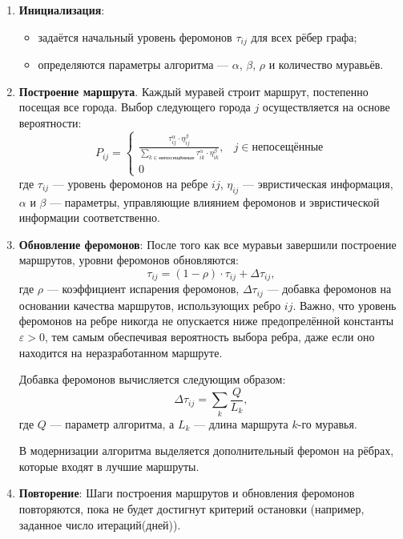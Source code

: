 \begin{enumerate}
	\item \textbf{Инициализация}:
	\begin{itemize}
		\item задаётся начальный уровень феромонов $\tau_{ij}$ для всех рёбер графа;
		\item определяются параметры алгоритма --- \(\alpha\), \(\beta\), \(\rho\) и количество муравьёв.
	\end{itemize}
	
	\item \textbf{Построение маршрута}.	Каждый муравей строит маршрут, постепенно посещая все города. Выбор следующего города $j$ осуществляется на основе вероятности:
	\begin{equation}
		P_{ij} = 
		\begin{cases}\label{for:Lev}
			\frac{\tau_{ij}^\alpha \cdot \eta_{ij}^\beta}{\sum_{k \in \text{непосещённые}} \tau_{ik}^\alpha \cdot \eta_{ik}^\beta}, & j \in \text{непосещённые} \\
			0 &
		\end{cases}
	\end{equation}
	где  $\tau_{ij}$ --- уровень феромонов на ребре $ij$,  $\eta_{ij}$ --- эвристическая информация,  $\alpha$ и $\beta$ --- параметры, управляющие влиянием феромонов и эвристической информации соответственно.
	
	\item \textbf{Обновление феромонов}:
	После того как все муравьи завершили построение маршрутов, уровни феромонов обновляются:
	\begin{equation}
		\tau_{ij} = (1 - \rho) \cdot \tau_{ij} + \Delta \tau_{ij},
	\end{equation}
	где $\rho$ --- коэффициент испарения феромонов, $\Delta \tau_{ij}$ --- добавка феромонов на основании качества маршрутов, использующих ребро $ij$.
	\newline Важно, что уровень феромонов на ребре никогда не опускается ниже предопрелённой константы $\varepsilon > 0$, тем самым обеспечивая вероятность выбора ребра, даже если оно находится на неразработанном маршруте.
	\par
	Добавка феромонов вычисляется следующим образом:
	\begin{equation}
		\Delta \tau_{ij} = \sum_{k} \frac{Q}{L_k},
	\end{equation}
	где $Q$ --- параметр алгоритма, а $L_k$ --- длина маршрута $k$-го муравья.
	
	В модернизации алгоритма выделяется дополнительный феромон на рёбрах, которые входят в лучшие маршруты.\par
		
	\item \textbf{Повторение}:
	Шаги построения маршрутов и обновления феромонов повторяются, пока не будет достигнут критерий остановки (например, заданное число итераций(дней)).
\end{enumerate}


\clearpage
